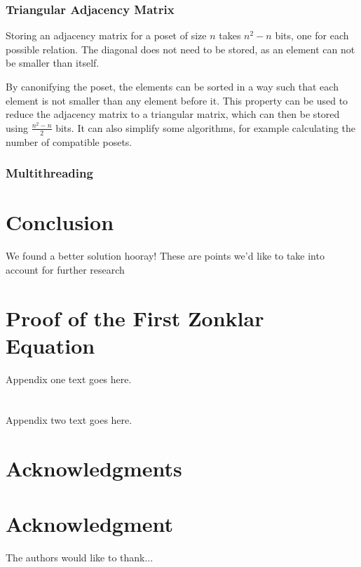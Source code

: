 \documentclass[10pt,journal,compsoc]{IEEEtran}
\begin{document}
\subsubsection{Triangular Adjacency Matrix}
Storing an adjacency matrix for a poset of size $n$ takes $n^2 - n$ bits, one for each possible relation.
The diagonal does not need to be stored, as an element can not be smaller than itself.

By canonifying the poset, the elements can be sorted in a way such that each element is not smaller than any element before it.
This property can be used to reduce the adjacency matrix to a triangular matrix, which can then be stored using $\frac{n^2 - n}{2}$ bits.
It can also simplify some algorithms, for example calculating the number of compatible posets.

\subsubsection{Multithreading}

\section{Conclusion}
We found a better solution hooray!
These are points we'd like to take into account for further research


\appendices
\section{Proof of the First Zonklar Equation}
Appendix one text goes here.
\section{}
Appendix two text goes here.


\ifCLASSOPTIONcompsoc
  \section*{Acknowledgments}
\else
  \section*{Acknowledgment}
\fi


The authors would like to thank...

\ifCLASSOPTIONcaptionsoff
  \newpage
\fi




\end{document}
